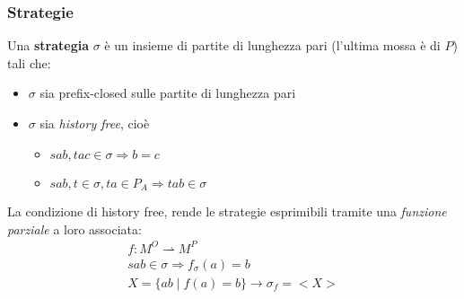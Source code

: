 \documentclass{beamer}
\begin{document}
\begin{frame}

	\frametitle{Strategie}
	
	Una \textbf{strategia} $\sigma$ è un insieme di partite di lunghezza pari (l'ultima mossa è di $P$) tali che:
	\begin{itemize}
		\item<2-> $\sigma$ sia prefix-closed sulle partite di lunghezza pari
		\item<3-> $\sigma$ sia \textit{history free}, cioè
		\begin{itemize}
			\item $sab , tac \in \sigma \Rightarrow b=c$
			\item $sab, t\in \sigma, ta\in P_A \Rightarrow tab\in \sigma$
		\end{itemize}
	\end{itemize}
	
	
	La condizione di history free, rende le strategie esprimibili tramite una \textit{funzione parziale} a loro associata:
	\begin{gather*}
		    f: M^O \rightharpoonup M^P\\
	            sab\in \sigma \Rightarrow f_\sigma(a)=b\\
	            X=\{ab\;|\;f(a)=b\} \rightarrow \sigma_f=<X> 
	\end{gather*}
	
	
\end{frame}
\end{document}
